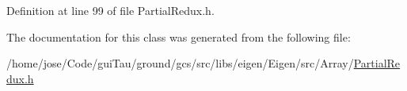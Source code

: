 Definition at line 99 of file Partial\-Redux.\-h.



The documentation for this class was generated from the following file\-:\begin{DoxyCompactItemize}
\item 
/home/jose/\-Code/gui\-Tau/ground/gcs/src/libs/eigen/\-Eigen/src/\-Array/\hyperlink{_partial_redux_8h}{Partial\-Redux.\-h}\end{DoxyCompactItemize}

